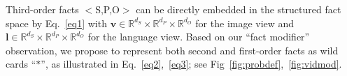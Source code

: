 \documentclass[runningheads]{llncs}
\begin{document}
Third-order facts $<$S,P,O$>$ can be directly embedded in the structured fact space by Eq.~\ref{eq1} with $\mathbf{v} \in  \mathbb{R}^{d_S} \times \mathbb{R}^{d_P} \times \mathbb{R}^{d_O}$ for the image view and $\mathbf{l}  \in  \mathbb{R}^{d_S} \times \mathbb{R}^{d_P} \times \mathbb{R}^{d_O}$ for the language view. %
Based on our ``fact modifier'' observation, we propose to represent both
second and first-order
facts as wild cards ``$*$'', as illustrated in Eq.~\ref{eq2},~\ref{eq3}; see Fig~\ref{fig:probdef},~\ref{fig:vidmod}.
\end{document}
